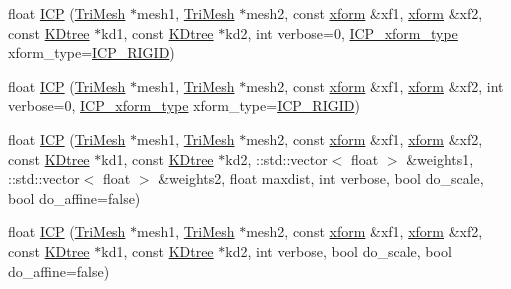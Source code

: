 \begin{DoxyCompactItemize}
\item 
float \hyperlink{namespacetrimesh_a48c046b2eee6d9f2febe817f3491e0ae}{I\+CP} (\hyperlink{classtrimesh_1_1TriMesh}{Tri\+Mesh} $\ast$mesh1, \hyperlink{classtrimesh_1_1TriMesh}{Tri\+Mesh} $\ast$mesh2, const \hyperlink{namespacetrimesh_ad504958f2f56e393991b848986a8459f}{xform} \&xf1, \hyperlink{namespacetrimesh_ad504958f2f56e393991b848986a8459f}{xform} \&xf2, const \hyperlink{classtrimesh_1_1KDtree}{K\+Dtree} $\ast$kd1, const \hyperlink{classtrimesh_1_1KDtree}{K\+Dtree} $\ast$kd2, int verbose=0, \hyperlink{namespacetrimesh_a64c747e4228158428e9cd911672cb1be}{I\+C\+P\+\_\+xform\+\_\+type} xform\+\_\+type=\hyperlink{namespacetrimesh_a64c747e4228158428e9cd911672cb1beab1d341808d3d7fb0bcff97fad1e83174}{I\+C\+P\+\_\+\+R\+I\+G\+ID})
\item 
float \hyperlink{namespacetrimesh_a0eee6ad23539d352b6afcefc4b521793}{I\+CP} (\hyperlink{classtrimesh_1_1TriMesh}{Tri\+Mesh} $\ast$mesh1, \hyperlink{classtrimesh_1_1TriMesh}{Tri\+Mesh} $\ast$mesh2, const \hyperlink{namespacetrimesh_ad504958f2f56e393991b848986a8459f}{xform} \&xf1, \hyperlink{namespacetrimesh_ad504958f2f56e393991b848986a8459f}{xform} \&xf2, int verbose=0, \hyperlink{namespacetrimesh_a64c747e4228158428e9cd911672cb1be}{I\+C\+P\+\_\+xform\+\_\+type} xform\+\_\+type=\hyperlink{namespacetrimesh_a64c747e4228158428e9cd911672cb1beab1d341808d3d7fb0bcff97fad1e83174}{I\+C\+P\+\_\+\+R\+I\+G\+ID})
\item 
float \hyperlink{namespacetrimesh_a71ee28e5aabcb5da6055c743e00d920b}{I\+CP} (\hyperlink{classtrimesh_1_1TriMesh}{Tri\+Mesh} $\ast$mesh1, \hyperlink{classtrimesh_1_1TriMesh}{Tri\+Mesh} $\ast$mesh2, const \hyperlink{namespacetrimesh_ad504958f2f56e393991b848986a8459f}{xform} \&xf1, \hyperlink{namespacetrimesh_ad504958f2f56e393991b848986a8459f}{xform} \&xf2, const \hyperlink{classtrimesh_1_1KDtree}{K\+Dtree} $\ast$kd1, const \hyperlink{classtrimesh_1_1KDtree}{K\+Dtree} $\ast$kd2, \+::std\+::vector$<$ float $>$ \&weights1, \+::std\+::vector$<$ float $>$ \&weights2, float maxdist, int verbose, bool do\+\_\+scale, bool do\+\_\+affine=false)
\item 
float \hyperlink{namespacetrimesh_a00bf593d97e195670637651eca9c9bd4}{I\+CP} (\hyperlink{classtrimesh_1_1TriMesh}{Tri\+Mesh} $\ast$mesh1, \hyperlink{classtrimesh_1_1TriMesh}{Tri\+Mesh} $\ast$mesh2, const \hyperlink{namespacetrimesh_ad504958f2f56e393991b848986a8459f}{xform} \&xf1, \hyperlink{namespacetrimesh_ad504958f2f56e393991b848986a8459f}{xform} \&xf2, const \hyperlink{classtrimesh_1_1KDtree}{K\+Dtree} $\ast$kd1, const \hyperlink{classtrimesh_1_1KDtree}{K\+Dtree} $\ast$kd2, int verbose, bool do\+\_\+scale, bool do\+\_\+affine=false)

\end{DoxyCompactItemize}
